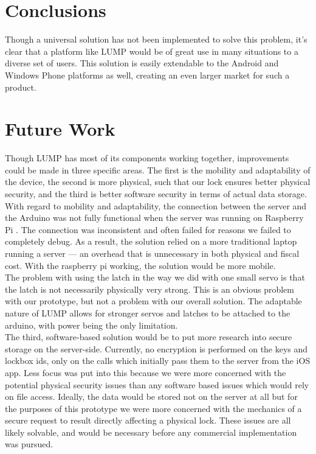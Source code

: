 \documentclass[10pt]{article}
\begin{document}
\begin{multicols}{2}
\section{Conclusions}
Though a universal solution has not been implemented to solve this problem, it's clear that a platform like LUMP would be of great use in many situations to a diverse set of users. This solution is easily extendable to the Android and Windows Phone platforms as well, creating an even larger market for such a product. 

\section{Future Work}
Though LUMP has most of its components working together, improvements could be made in three specific areas. The first is the mobility and adaptability of the device, the second is more physical, such that our lock ensures better physical security, and the third is better software security in terms of actual data storage.\\

With regard to mobility and adaptability, the connection between the server and the Arduino was not fully functional when the server was running on Raspberry Pi \cite{breakfastserialissue}. The connection was inconsistent and often failed for reasons we failed to completely debug. As a result, the solution relied on a more traditional laptop running a server --- an overhead that is unnecessary in both physical and fiscal cost. With the raspberry pi working, the solution would be more mobile.\\

The problem with using the latch in the way we did with one small servo is that the latch is not necessarily physically very strong. This is an obvious problem with our prototype, but not a problem with our overall solution. The adaptable nature of LUMP allows for stronger servos and latches to be attached to the arduino, with power being the only limitation.\\

The third, software-based solution would be to put more research into secure storage on the server-side. Currently, no encryption is performed on the keys and lockbox ids, only on the calls which initially pass them to the server from the iOS app. Less focus was put into this because we were more concerned with the potential physical security issues than any software based issues which would rely on file access. Ideally, the data would be stored not on the server at all but for the purposes of this prototype we were more concerned with the mechanics of a secure request to result directly affecting a physical lock. These issues are all likely solvable, and would be necessary before any commercial implementation was pursued.\\



\end{multicols}
\end{document}
